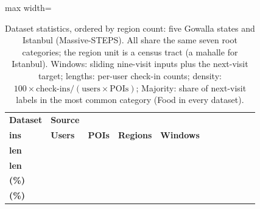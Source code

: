 \begin{table}[htbp]
\caption{Dataset statistics, ordered by region count: five Gowalla states and Istanbul
(Massive-STEPS). All share the same seven root categories; the region unit is a census
tract (a mahalle for Istanbul). Windows: sliding nine-visit inputs plus the next-visit
target; lengths: per-user check-in counts; density: $100\times\text{check-ins}/(\text{users}\times\text{POIs})$; Majority: share of next-visit
labels in the most common category (Food in every dataset).}
\label{tab:mobiwac:datasets}
\centering
\setlength{\tabcolsep}{3pt}
\begin{adjustbox}{max width=\textwidth}
\begin{tabular}{l l r r r r r r r r r}
\toprule
\textbf{Dataset} & \textbf{Source} & \shortstack[r]{\textbf{Check-}\\\textbf{ins}} & \textbf{Users} & \textbf{POIs} &
\textbf{Regions} & \textbf{Windows} & \shortstack[r]{\textbf{Max}\\\textbf{len}} & \shortstack[r]{\textbf{Avg}\\\textbf{len}} & \shortstack[r]{\textbf{Density}\\\textbf{(\%)}} & \shortstack[r]{\textbf{Majority}\\\textbf{(\%)}} \\

\end{tabular}
\end{adjustbox}
\end{table}
